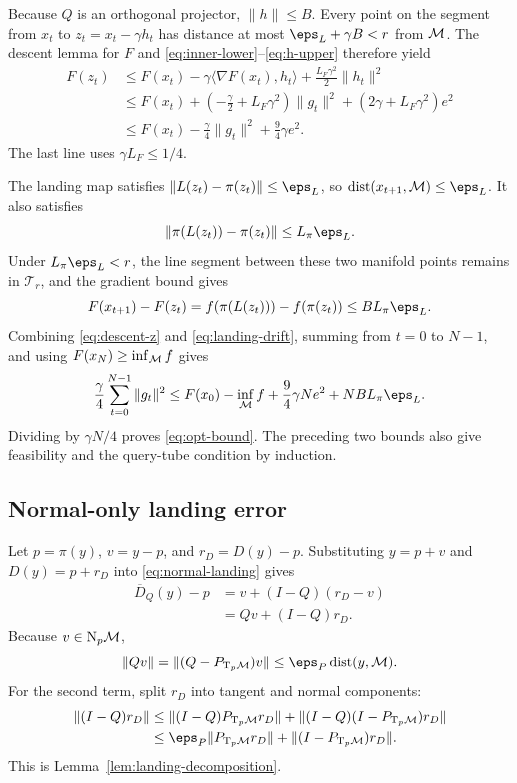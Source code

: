Because $Q$ is an orthogonal projector, $\|h\|\le B$.  Every point on the segment from $x_t$ to
$z_t=x_t-\gamma h_t$ has distance at most
$\eps_L+\gamma B<r$ from $\mathcal{M}$.  The descent lemma for $F$ and
\eqref{eq:inner-lower}--\eqref{eq:h-upper} therefore yield
\begin{align}
  F(z_t)
  &\le F(x_t)-\gamma\langle\nabla F(x_t),h_t\rangle
      +\frac{L_F\gamma^2}{2}\|h_t\|^2\\
  &\le F(x_t)
  +\left(-\frac{\gamma}{2}+L_F\gamma^2\right)\|g_t\|^2
  +\left(2\gamma+L_F\gamma^2\right)e^2\\
  &\le F(x_t)-\frac{\gamma}{4}\|g_t\|^2
  +\frac94\gamma e^2.
  \label{eq:descent-z}
\end{align}
The last line uses $\gamma L_F\le1/4$.

The landing map satisfies $\|L(z_t)-\pi(z_t)\|\le\eps_L$, so
$\dist(x_{t+1},\M)\le\eps_L$.  It also satisfies
\[
  \|\pi(L(z_t))-\pi(z_t)\|
  \le L_\pi\eps_L.
\]
Under $L_\pi\eps_L<r$, the line segment between these two manifold points remains in $\mathcal T_r$, and the gradient bound gives
\begin{equation}
  F(x_{t+1})-F(z_t)
  =f(\pi(L(z_t)))-f(\pi(z_t))
  \le BL_\pi\eps_L.
  \label{eq:landing-drift}
\end{equation}
Combining \eqref{eq:descent-z} and \eqref{eq:landing-drift}, summing from
$t=0$ to $N-1$, and using $F(x_N)\ge\inf_{\mathcal{M}} f$ gives
\[
  \frac{\gamma}{4}\sum_{t=0}^{N-1}\|g_t\|^2
  \le F(x_0)-\inf_\M f
  +\frac94\gamma N e^2
  +NBL_\pi\eps_L.
\]
Dividing by $\gamma N/4$ proves \eqref{eq:opt-bound}.  The preceding two bounds also give feasibility and the query-tube condition by induction.

\subsection{Normal-only landing error}

Let $p=\pi(y)$, $v=y-p$, and $r_D=D(y)-p$.  Substituting
$y=p+v$ and $D(y)=p+r_D$ into \eqref{eq:normal-landing} gives
\begin{align}
  \overline D_Q(y)-p
  &=v+(I-Q)(r_D-v)\\
  &=Qv+(I-Q)r_D.
\end{align}
Because $v\in\mathrm{N}_p\mathcal{M}$,
\[
  \|Qv\|=\|(Q-P_{\T_p\M})v\|
  \le\eps_P\dist(y,\M).
\]
For the second term, split $r_D$ into tangent and normal components:
\begin{align}
  \|(I-Q)r_D\|
  &\le \|(I-Q)P_{\T_p\M}r_D\|
      +\|(I-Q)(I-P_{\T_p\M})r_D\|\\
  &\le \eps_P\|P_{\T_p\M}r_D\|
      +\|(I-P_{\T_p\M})r_D\|.
\end{align}
This is Lemma~\ref{lem:landing-decomposition}.

